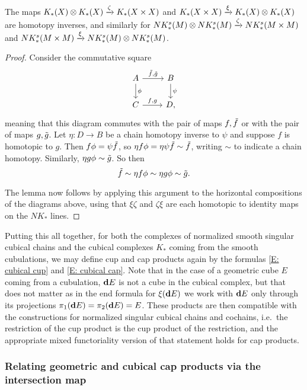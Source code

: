 \begin{lemma}\label{L: EZ for cubical}
	The maps $K_*(X) \otimes K_*(X) \xrightarrow{\zeta}  K_*(X \times X)$ and $K_*(X \times X) \xrightarrow{\xi} K_*(X) \otimes K_*(X)$ are homotopy inverses, and similarly for $NK^s_*(M) \otimes NK^s_*(M) \xrightarrow{\zeta}  NK^s_*(M \times M)$ and $NK^s_*(M \times M) \xrightarrow{\xi} NK^s_*(M) \otimes NK^s_*(M) $.
\end{lemma}
\begin{proof}
	Consider the commutative square
	\[
	\begin{tikzcd}
	A \arrow[r,"\td f{,} \td g"]\arrow[d,"\phi"]& B\arrow[d,"\psi"]\\
	C \arrow[r,"f{,} g"]& D,
	\end{tikzcd}
	\]
	meaning that this diagram commutes with the pair of maps $f, \tilde f$ or with the pair of maps $g,\tilde g$.
	Let $\eta \colon D \to B$ be a chain homotopy inverse to $\psi$ and suppose $f$ is homotopic to $g$.
	Then $f \phi = \psi \tilde f$, so $\eta f \phi = \eta \psi \tilde f \sim \tilde f$, writing $\sim$ to indicate a chain homotopy.
	Similarly,  $\eta g \phi \sim \tilde g$.
	So then $$\tilde f \sim \eta f \phi  \sim \eta g \phi \sim \tilde g.$$

	The lemma now follows by applying this argument to the horizontal compositions of the diagrams above, using that $\xi \zeta$ and $\zeta \xi$ are each homotopic to identity maps on the $NK_*$ lines.
\end{proof}


Putting this all together, for both the complexes of normalized smooth singular cubical chains and the cubical complexes $K_*$ coming from the smooth cubulations, we may define cup and cap products again by the formulas \eqref{E: cubical cup} and \eqref{E: cubical cap}.
Note that in the case of a geometric cube $E$ coming from a cubulation, $\mathbf{d} E$ is not a cube in the cubical complex, but that does not matter as in the end formula for $\xi(\mathbf{d} E)$ we work with $\mathbf{d} E$ only through its projections $\pi_1(\mathbf{d} E) = \pi_2(\mathbf{d} E) = E$.
These products are then compatible with the constructions for normalized singular cubical chains and cochains, i.e.\ the restriction of the cup product is the cup product of the restriction, and the appropriate mixed functoriality version of that statement holds for cap products.

\subsubsection{Relating geometric and cubical cap products via the intersection map}

